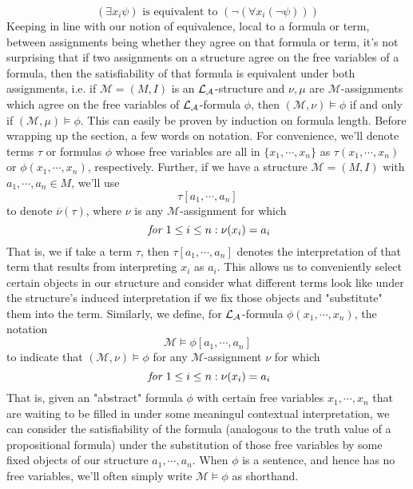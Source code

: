 \documentclass{article}
\begin{document}
    $$ (\exists x_i \psi) \text{ is equivalent to } (\neg (\forall x_i (\neg \psi))) $$
Keeping in line with our notion of equivalence, local to a formula or term, between assignments being whether they agree on that formula or term, it's not surprising that if two assignments on a structure agree on the free variables of a formula, then the satisfiability of that formula is equivalent under both assignments, i.e. if $ \mathcal{M} = (M, I) $ is an $ \mathcal{L}_{\mathcal{A}} $-structure and $ \nu, \mu $ are $ \mathcal{M} $-assignments which agree on the free variables of $ \mathcal{L}_{\mathcal{A}} $-formula $ \phi $, then $ (\mathcal{M}, \nu) \vDash \phi $ if and only if $ (\mathcal{M}, \mu) \vDash \phi $. This can easily be proven by induction on formula length.
\nn
Before wrapping up the section, a few words on notation. For convenience, we'll denote terms $ \tau $ or formulas $ \phi $ whose free variables are all in $ \{ x_1, \cdots, x_n \} $ as $ \tau(x_1, \cdots, x_n) $ or $ \phi(x_1, \cdots, x_n) $, respectively. Further, if we have a structure $ \mathcal{M} = (M, I) $ with $ a_1, \cdots, a_n \in M $, we'll use
    $$ \tau[a_1, \cdots, a_n] $$
to denote $ \overline{\nu}(\tau) $, where $ \nu $ is any $ \mathcal{M} $-assignment for which
    $$ \textit{ for } 1 \leq i \leq n: \nu(x_i) = a_i $$
That is, we if take a term $ \tau $, then $ \tau[a_1, \cdots, a_n] $ denotes the interpretation of that term that results from interpreting $ x_i $ as $ a_i $. This allows us to conveniently select certain objects in our structure and consider what different terms look like under the structure's induced interpretation if we fix those objects and "substitute" them into the term. Similarly, we define, for $ \mathcal{L}_{\mathcal{A}} $-formula $ \phi(x_1, \cdots, x_n) $, the notation
    $$ \mathcal{M} \vDash \phi[a_1, \cdots, a_n] $$
to indicate that $ (\mathcal{M}, \nu) \vDash \phi $ for any $ \mathcal{M} $-assignment $ \nu $ for which
    $$ \textit{ for } 1 \leq i \leq n: \nu(x_i) = a_i $$
That is, given an "abstract" formula $ \phi $ with certain free variables $ x_1, \cdots, x_n $ that are waiting to be filled in under some meaningul contextual interpretation, we can consider the satisfiability of the formula (analogous to the truth value of a propositional formula) under the substitution of those free variables by some fixed objects of our structure $ a_1, \cdots, a_n $. When $ \phi $ is a sentence, and hence has no free variables, we'll often simply write $ \mathcal{M} \vDash \phi $ as shorthand.
\end{document}
